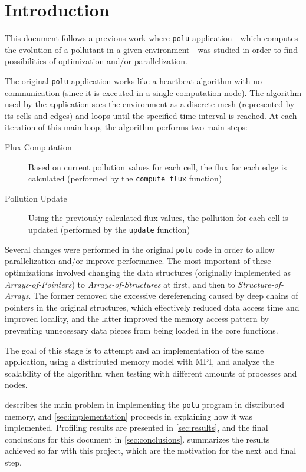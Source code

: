 \section{Introduction}
\label{sec:intro}

This document follows a previous work where \texttt{polu} application - which computes the evolution of a pollutant in a given environment - was studied in order to find possibilities of optimization and/or parallelization.

The original \texttt{polu} application works like a heartbeat algorithm with no communication (since it is executed in a single computation node). The algorithm used by the application sees the environment as a discrete mesh (represented by its cells and edges) and loops until the specified time interval is reached. At each iteration of this main loop, the algorithm performs two main steps:

\begin{description}
	\item[Flux Computation] Based on current pollution values for each cell, the flux for each edge is calculated (performed by the \texttt{compute\_flux} function)
	\item[Pollution Update] Using the previously calculated flux values, the pollution for each cell is updated (performed by the \texttt{update} function)
\end{description}

Several changes were performed in the original \texttt{polu} code in order to allow parallelization and/or improve performance. The most important of these optimizations involved changing the data structures (originally implemented as \textit{Arrays-of-Pointers}) to \textit{Arrays-of-Structures} at first, and then to \textit{Structure-of-Arrays}. The former removed the excessive dereferencing caused by deep chains of pointers in the original structures, which effectively reduced data access time and improved locality, and the latter improved the memory access pattern by preventing unnecessary data pieces from being loaded in the core functions.

The goal of this stage is to attempt and an implementation of the same application, using a distributed memory model with MPI, and analyze the scalability of the algorithm when testing with different amounts of processes and nodes.

 describes the main problem in implementing the \texttt{polu} program in distributed memory, and \cref{sec:implementation} proceeds in explaining how it was implemented. Profiling results are presented in \cref{sec:results}, and the final conclusions for this document in \cref{sec:conclusions}.  summarizes the results achieved so far with this project, which are the motivation for the next and final step.